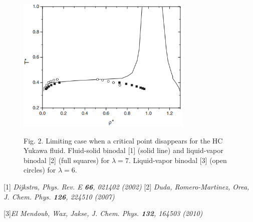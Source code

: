 \documentclass[8pt]{beamer}
\begin{document}
\begin{frame}
\begin{columns}
			\begin{column}{0.5\textwidth}
				\begin{figure}[htbp]
					\includegraphics[width=0.75\textwidth,angle=0]{limit_cp} \\
					\parbox{1.0\textwidth}{\caption*{Fig. 2. Limiting case when a critical point disappears for the HC Yukawa fluid. Fluid-solid binodal [1] (solid line) and liquid-vapor binodal [2] (full squares) for $\lambda=7$. Liquid-vapor binodal [3] (open circles) for $\lambda = 6$.
					}}
				\end{figure}
				
				[1] \textit{Dijkstra, Phys. Rev. E \textbf{66}, 021402 (2002)}
				[2] \textit{Duda, Romero-Martinez, Orea, J. Chem. Phys. \textbf{126}, 224510 (2007)}
				
				[3]\textit{El Mendoub, Wax, Jakse, J. Chem. Phys. \textbf{132}, 164503 (2010)}
			\end{column}
			
		\end{columns}
		
	\end{frame}
	
\end{document}
